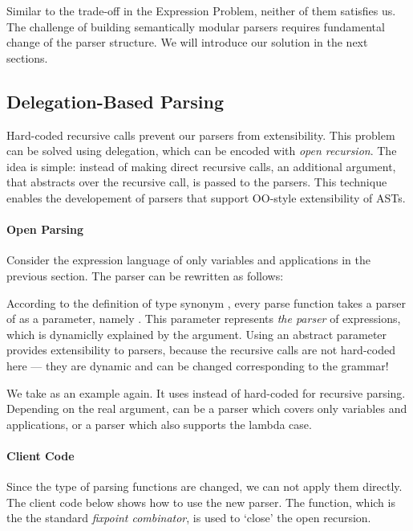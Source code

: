Similar to the trade-off in the Expression Problem, neither of them satisfies us. The challenge of building semantically modular parsers requires fundamental change of the parser structure. We will introduce our solution in the next sections.

\subsection{Delegation-Based Parsing}\label{subsec:overview-firstlook}

Hard-coded recursive calls prevent our parsers from extensibility.
This problem can be solved using delegation, which can be encoded with \textit{open recursion}. The idea is
simple: instead of making direct recursive calls, an additional
argument, that abstracts over the recursive call, is passed to the
parsers. This technique enables the developement of parsers that
support OO-style extensibility of ASTs.

\paragraph{Open Parsing} Consider the expression language of only variables and applications in the previous section. The parser can be rewritten as follows:


According to the definition of type synonym , every parse function takes a parser of  as a parameter, namely . This parameter  represents \emph{the parser} of expressions, which is dynamiclly explained by the argument. Using an abstract parameter provides extensibility to parsers, because the recursive calls are not hard-coded here --- they are dynamic and can be changed corresponding to the grammar!

We take  as an example again. It uses  instead of hard-coded  for recursive parsing. Depending on the real argument,  can be a parser which covers only variables and applications, or a parser which also supports the lambda case.

\paragraph{Client Code} Since the type of parsing functions are changed, we can not apply them directly. The client code below shows how to use the new parser. The  function, which is the the standard \textit{fixpoint combinator}, is used to `close' the open recursion.

